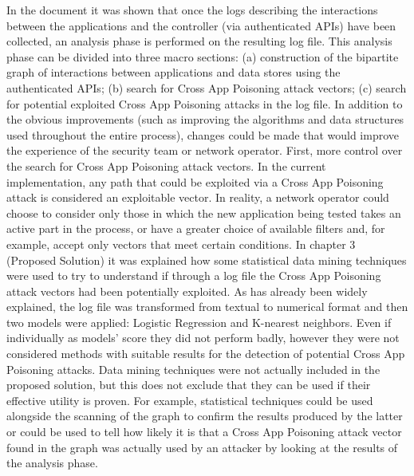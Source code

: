 \documentclass[a4paper,10pt]{memoir}
\begin{document}
{%
In the document it was shown that once the logs describing the interactions between the applications and the controller (via authenticated APIs) have been collected, an analysis phase is performed on the resulting log file. This analysis phase can be divided into three macro sections: (a) construction of the bipartite graph of interactions between applications and data stores using the authenticated APIs; (b) search for Cross App Poisoning attack vectors; (c) search for potential exploited Cross App Poisoning attacks in the log file. In addition to the obvious improvements (such as improving the algorithms and data structures used throughout the entire process), changes could be made that would improve the experience of the security team or network operator. First, more control over the search for Cross App Poisoning attack vectors. In the current implementation, any path that could be exploited via a Cross App Poisoning attack is considered an exploitable vector. In reality, a network operator could choose to consider only those in which the new application being tested takes an active part in the process, or have a greater choice of available filters and, for example, accept only vectors that meet certain conditions. In chapter 3 (Proposed Solution) it was explained how some statistical data mining techniques were used to try to understand if through a log file the Cross App Poisoning attack vectors had been potentially exploited. As has already been widely explained, the log file was transformed from textual to numerical format and then two models were applied: Logistic Regression and K-nearest neighbors. Even if individually as models' score they did not perform badly, however they were not considered methods with suitable results for the detection of potential Cross App Poisoning attacks. Data mining techniques were not actually included in the proposed solution, but this does not exclude that they can be used if their effective utility is proven. For example, statistical techniques could be used alongside the scanning of the graph to confirm the results produced by the latter or could be used to tell how likely it is that a Cross App Poisoning attack vector found in the graph was actually used by an attacker by looking at the results of the analysis phase. 
\medskip

}
\end{document}
